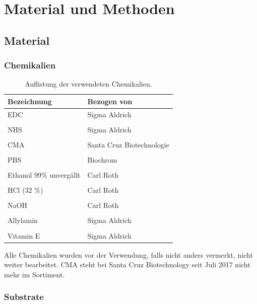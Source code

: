 \chapter{Material und Methoden}
\label{kap:material_und_methoden}

\section{Material}
\label{sec:material}

\subsection{Chemikalien}
\label{subsec:chemikalien}

\begin{table}[H]
	\centering
	\keepXColumns
	\caption{Auflistung der verwendeten Chemikalien.}
	\begin{tabularx}{\textwidth}{X X}
		\textbf{Bezeichnung}	&	\textbf{Bezogen von}	\\
		\toprule
		\toprule
		\ac{EDC}	&	Sigma Aldrich	\\
		&\\
		\ac{NHS}	&	Sigma Aldrich	\\
		&\\
		\ac{CMA}	&	Santa Cruz Biotechnologie	\\
		&\\
		\ac{PBS}	&	Biochrom	\\
		&\\
		Ethanol 99\% unvergällt	&	Carl Roth	\\
		&\\
		\ac{HCl} (32 \%)	&	Carl Roth	\\
		&\\
		\ac{NaOH}	&	Carl Roth	\\
		&\\
		Allylamin	&	Sigma Aldrich	\\
		&\\
		Vitamin E	&	Sigma Aldrich	\\
		\toprule
		\toprule
	\end{tabularx}
	\label{tab:chemikalien}
\end{table}

Alle Chemikalien wurden vor der Verwendung, falls nicht anders vermerkt, nicht weiter bearbeitet. \acs*{CMA} steht bei Santa Cruz Biotechnology seit Juli 2017 nicht mehr im Sortiment.

\subsection{Substrate}
\label{subsec:substrate}

